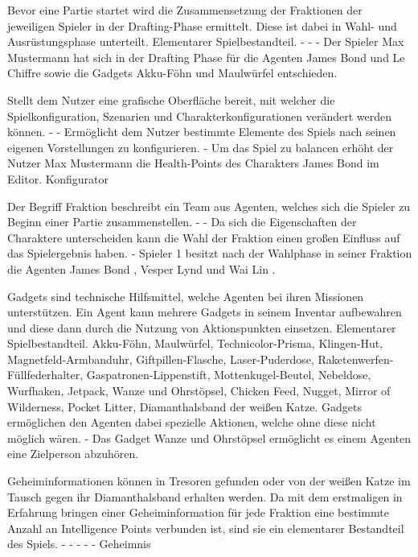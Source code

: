 {Bevor eine Partie startet wird die Zusammensetzung der Fraktionen der jeweiligen Spieler in der Drafting-Phase ermittelt. Diese ist dabei in Wahl- und Ausrüstungsphase unterteilt. }
{Elementarer Spielbestandteil.}
{-}
{-}
{-}
{Der Spieler \glqq{}Max Mustermann \grqq{} hat sich in der Drafting Phase für die Agenten \glqq{}James Bond\grqq{} und \glqq{}Le Chiffre\grqq{} sowie die Gadgets \glqq{}Akku-Föhn\grqq{} und \glqq{}Maulwürfel \grqq{} entschieden.}

{Stellt dem Nutzer eine grafische Oberfläche bereit, mit welcher die Spielkonfiguration, Szenarien und Charakterkonfigurationen verändert werden können.}
{-}
{-}
{Ermöglicht dem Nutzer bestimmte Elemente des Spiels nach seinen eigenen Vorstellungen zu konfigurieren.}
{-}
{Um das Spiel zu balancen erhöht der Nutzer \glqq{}Max Mustermann\grqq{} die Health-Points des Charakters \glqq{}James Bond\grqq{} im Editor.}
{Konfigurator}

{Der Begriff Fraktion beschreibt ein Team aus Agenten, welches sich die Spieler zu Beginn einer Partie zusammenstellen. }
{-}
{-}
{Da sich die Eigenschaften der Charaktere unterscheiden kann die Wahl der Fraktion einen großen Einfluss auf das Spielergebnis haben.}
{-}
{Spieler 1 besitzt nach der Wahlphase in seiner Fraktion die Agenten \glqq{}James Bond\grqq{} , \glqq{}Vesper Lynd\grqq{} und \glqq{}Wai Lin\grqq{} .}

{Gadgets sind technische Hilfsmittel, welche Agenten bei ihren Missionen unterstützen. Ein Agent kann mehrere Gadgets in seinem Inventar aufbewahren und diese dann durch die Nutzung von Aktionspunkten einsetzen. }
{Elementarer Spielbestandteil.}
{Akku-Föhn, Maulwürfel, Technicolor-Prisma, Klingen-Hut, Magnetfeld-Armbanduhr, Giftpillen-Flasche, Laser-Puderdose, Raketenwerfen-Füllfederhalter, Gaspatronen-Lippenstift, Mottenkugel-Beutel, Nebeldose, Wurfhaken, Jetpack, Wanze und Ohrstöpsel, Chicken Feed, Nugget, Mirror of Wilderness, Pocket Litter, Diamanthalsband der weißen Katze.}
{Gadgets ermöglichen den Agenten dabei spezielle Aktionen, welche ohne diese nicht möglich wären. }
{-}
{Das Gadget \glqq{}Wanze und Ohrstöpsel\grqq{} ermöglicht es einem Agenten eine Zielperson abzuhören.}

{Geheiminformationen können in Tresoren gefunden oder von der weißen Katze im Tausch gegen ihr Diamanthalsband erhalten werden. Da mit dem erstmaligen in Erfahrung bringen einer Geheiminformation für jede Fraktion eine bestimmte Anzahl an Intelligence Points verbunden ist, sind sie ein elementarer Bestandteil des Spiels. }
{-}
{-}
{-}
{-}
{-}
{Geheimnis}

